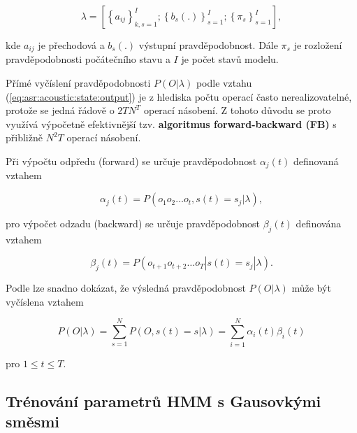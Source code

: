 \begin{equation}
  \lambda = \left[\left\{a_{ij}\right\}_{k,s=1}^{I}; \left\{b_s(.)\right\}_{s=1}^{I};\left\{\pi_{s}\right\}_{s=1}^{I}\right],
  \label{eq:asr:acoustic:structure:marking}
\end{equation}

\noindent kde $a_{ij}$ je přechodová a $b_s(.)$ výstupní pravděpodobnost. Dále $\pi_s$ je rozložení pravděpodobnosti počátečního stavu a $I$ je počet stavů modelu.

Přímé vyčíslení pravděpodobnosti $P\left(O|\lambda\right)$ podle vztahu (\ref{eq:asr:acoustic:state:output}) je z hlediska počtu operací často nerealizovatelné, protože se jedná řádově o $2TN^{T}$ operací násobení. Z tohoto důvodu se proto využívá výpočetně efektivnější tzv. \textbf{algoritmus forward-backward (FB)} s přibližně $N^{2}T$ operací násobení.

Při výpočtu odpředu (forward) se určuje pravděpodobnost $\alpha_j\left(t\right)$ definovaná vztahem

\begin{equation}
  \alpha_{j}\left(t\right) = P\left(o_1o_2\dots o_t, s\left(t\right)=s_j|\lambda\right),
  \label{eq:asr:acoustic:structure:forward}
\end{equation}

\noindent pro výpočet odzadu (backward) se určuje pravděpodobnost $\beta_j\left(t\right)$ definována vztahem


\begin{equation}
  \beta_j\left(t\right) = P\left(o_{t+1}o_{t+2}\dots o_T|s\left(t\right)=s_j|\lambda\right).
  \label{eq:asr:acoustic:structure:backward}
\end{equation}

Podle \cite{Psutka2006} lze snadno dokázat, že výsledná pravděpodobnost $P\left(O|\lambda\right)$ může být vyčíslena vztahem

\begin{equation}
  P\left(O|\lambda\right) = \sum_{s=1}^{N} P\left(O, s\left(t\right) = s | \lambda\right) = \sum_{i = 1}^{N} \alpha_{i}\left(t\right)\beta_{i}\left(t\right)
  \label{eq:asr:acoustic:structure:forward-backward}
\end{equation}

\noindent pro $1 \leq t \leq T$.

\subsection{Trénování parametrů HMM s Gausovkými směsmi}
\label{chap:asr:acoustic:GMM}

